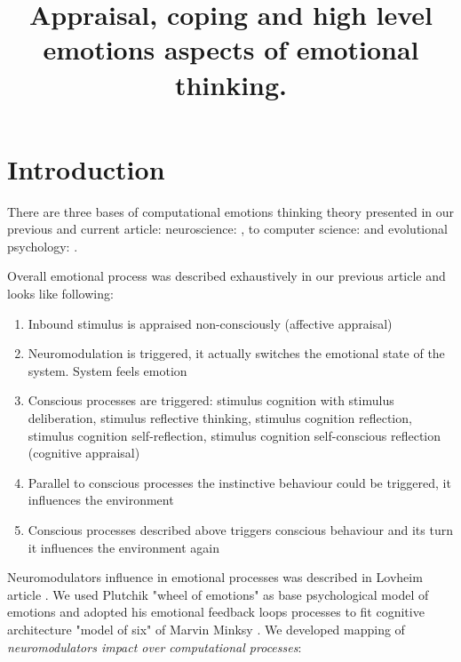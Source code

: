 \title{Appraisal, coping and high level emotions aspects of emotional thinking.}

\section{Introduction}

There are three bases of computational emotions thinking theory presented in our previous\cite{computational_emotional_thinking} and current article: neuroscience: \cite{emotionsbraintorobot, parsingreward, neuromodulatory, cubeofemotions, natureofemotions}, to computer science: \cite{emotionandsociable, senticcomputing, hourglass, affectivemodelofinterplay, affectivecomputing, computationalmodelsemotion, computationalmodelsemotionscognition, evaluatingcomutationalmodel, threelevel} and evolutional psychology: \cite{natureofemotions, primer_affect_psychology, tomkins1, tomkins2, tomkins3, tomkins4}.

Overall emotional process was described exhaustively in our previous article \cite{computational_emotional_thinking} and looks like following:

\begin{enumerate}
\item  Inbound stimulus is appraised non-consciously (affective appraisal)
\item  Neuromodulation is triggered, it actually switches the emotional state of the system. System feels emotion
\item  Conscious processes are triggered: stimulus cognition with stimulus deliberation, stimulus reflective thinking, stimulus cognition reflection, stimulus cognition self-reflection, stimulus cognition self-conscious reflection (cognitive appraisal)
\item  Parallel to conscious processes the instinctive behaviour could be triggered, it influences the environment
\item  Conscious processes described above triggers conscious behaviour and its turn it influences the environment again
\end{enumerate}

Neuromodulators influence in emotional processes was described in Lovheim article \cite{cubeofemotions}. We used Plutchik "wheel of emotions" as base psychological model of emotions \cite{natureofemotions} and adopted his emotional feedback loops processes to fit cognitive architecture "model of six" of Marvin Minksy \cite{emotionmachine}. We developed mapping of \emph{neuromodulators impact over computational processes}:

